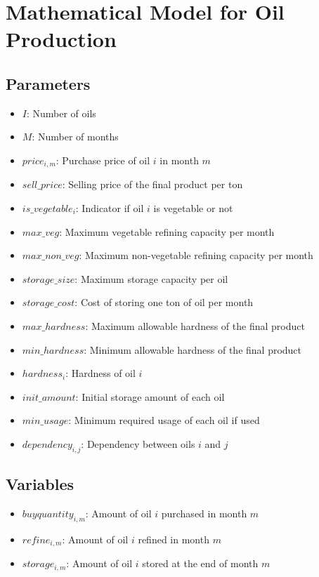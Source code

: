 \documentclass{article}
\begin{document}
\section*{Mathematical Model for Oil Production}

\subsection*{Parameters}
\begin{itemize}
    \item $I$: Number of oils
    \item $M$: Number of months
    \item $price_{i,m}$: Purchase price of oil $i$ in month $m$
    \item $sell\_price$: Selling price of the final product per ton
    \item $is\_vegetable_{i}$: Indicator if oil $i$ is vegetable or not
    \item $max\_veg$: Maximum vegetable refining capacity per month
    \item $max\_non\_veg$: Maximum non-vegetable refining capacity per month
    \item $storage\_size$: Maximum storage capacity per oil
    \item $storage\_cost$: Cost of storing one ton of oil per month
    \item $max\_hardness$: Maximum allowable hardness of the final product
    \item $min\_hardness$: Minimum allowable hardness of the final product
    \item $hardness_{i}$: Hardness of oil $i$
    \item $init\_amount$: Initial storage amount of each oil
    \item $min\_usage$: Minimum required usage of each oil if used
    \item $dependency_{i,j}$: Dependency between oils $i$ and $j$
\end{itemize}

\subsection*{Variables}
\begin{itemize}
    \item $buyquantity_{i,m}$: Amount of oil $i$ purchased in month $m$
    \item $refine_{i,m}$: Amount of oil $i$ refined in month $m$
    \item $storage_{i,m}$: Amount of oil $i$ stored at the end of month $m$
\end{itemize}
\end{document}
